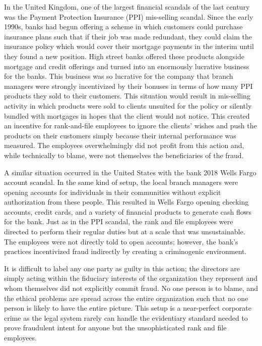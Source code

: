 In the United Kingdom, one of the largest financial scandals of the last century
was the Payment Protection Insurance (PPI) mis-selling scandal. Since the early
1990s, banks had begun offering a scheme in which customers could purchase
insurance plans such that if their job was made redundant, they could claim the
insurance policy which would cover their mortgage payments in the interim until
they found a new position. High street banks offered these products alongside
mortgage and credit offerings and turned into an enormously lucrative business
for the banks. This business was so lucrative for the company that branch
managers were strongly incentivized by their bonuses in terms of how many PPI
products they sold to their customers. This situation would result in
mis-selling activity in which products were sold to clients unsuited for the
policy or silently bundled with mortgages in hopes that the client would not
notice. This created an incentive for rank-and-file employees to ignore the
clients' wishes and push the products on their customers simply because their
internal performance was measured. The employees overwhelmingly did not profit
from this action and, while technically to blame, were not themselves the
beneficiaries of the fraud.

A similar situation occurred in the United States with the bank 2018 Wells Fargo
account scandal. In the same kind of setup, the local branch managers were
opening accounts for individuals in their communities without explicit
authorization from these people. This resulted in Wells Fargo opening checking
accounts, credit cards, and a variety of financial products to generate cash
flows for the bank. Just as in the PPI scandal, the rank and file employees were
directed to perform their regular duties but at a scale that was unsustainable.
The employees were not directly told to open accounts; however, the bank's
practices incentivized fraud indirectly by creating a criminogenic environment.


It is difficult to label any one party as guilty in this action; the directors
are simply acting within the fiduciary interests of the organization they
represent and whom themselves did not explicitly commit fraud. No one person is
to blame, and the ethical problems are spread across the entire organization
such that no one person is likely to have the entire picture. This setup is a
near-perfect corporate crime as the legal system rarely can handle the
evidentiary standard needed to prove fraudulent intent for anyone but the
unsophisticated rank and file employees.

